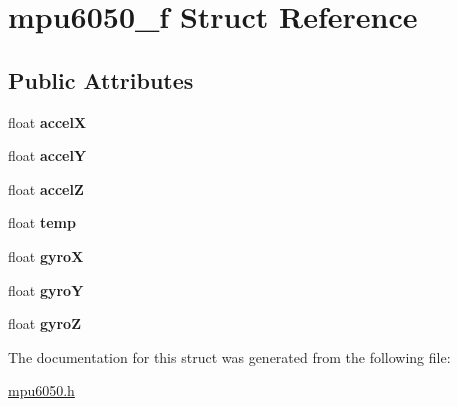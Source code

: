 \hypertarget{structmpu6050__f}{}\section{mpu6050\+\_\+f Struct Reference}
\label{structmpu6050__f}
\subsection*{Public Attributes}
\begin{DoxyCompactItemize}
\item 
\mbox{\label{structmpu6050__f_ae1a231d8c1f6e9774d139f86827e66e9}} 
float {\bfseries accelX}
\item 
\mbox{\label{structmpu6050__f_a1621b7a2d56e6c51e43019fe3c0b9033}} 
float {\bfseries accelY}
\item 
\mbox{\label{structmpu6050__f_a0cddb44272fc95b87c8fb19caf59d4ac}} 
float {\bfseries accelZ}
\item 
\mbox{\label{structmpu6050__f_a6111a88fd6044126275b43e88be5bedc}} 
float {\bfseries temp}
\item 
\mbox{\label{structmpu6050__f_a800cead01d2de6ac814684a145ec7c53}} 
float {\bfseries gyroX}
\item 
\mbox{\label{structmpu6050__f_abc55afc127c40b7797bef8d4965b8939}} 
float {\bfseries gyroY}
\item 
\mbox{\label{structmpu6050__f_a7c3f52a114e6417080ebdbb3d6560a1a}} 
float {\bfseries gyroZ}
\end{DoxyCompactItemize}


The documentation for this struct was generated from the following file\+:\begin{DoxyCompactItemize}
\item 
\hyperlink{mpu6050_8h}{mpu6050.\+h}\end{DoxyCompactItemize}
